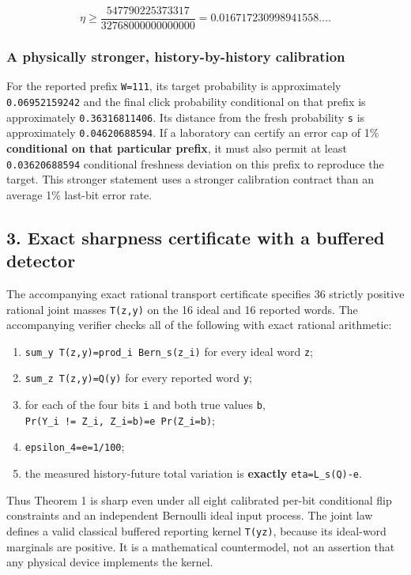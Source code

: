 \documentclass[
  10pt,
  a4paper,
]{article}
\providecommand{\tightlist}{%
  \setlength{\itemsep}{0pt}\setlength{\parskip}{0pt}}
\begin{document}
\[
 \boxed{\eta\ge\frac{547790225373317}{32768000000000000}
         =0.016717230998941558\ldots .}
\]

\subsubsection{A physically stronger, history-by-history calibration}\label{a-physically-stronger-history-by-history-calibration}

For the reported prefix \texttt{W=111}, its target probability is approximately \texttt{0.06952159242} and the final click probability conditional on that prefix is approximately \texttt{0.36316811406}. Its distance from the fresh probability \texttt{s} is approximately \texttt{0.04620688594}. If a laboratory can certify an error cap of 1\% \textbf{conditional on that particular prefix}, it must also permit at least \texttt{0.03620688594} conditional freshness deviation on this prefix to reproduce the target. This stronger statement uses a stronger calibration contract than an average 1\% last-bit error rate.

\subsection{3. Exact sharpness certificate with a buffered detector}\label{exact-sharpness-certificate-with-a-buffered-detector}

The accompanying exact rational transport certificate specifies 36 strictly positive rational joint masses \texttt{T(z,y)} on the 16 ideal and 16 reported words. The accompanying verifier checks all of the following with exact rational arithmetic:

\begin{enumerate}
\def\labelenumi{\arabic{enumi}.}
\tightlist
\item
  \texttt{sum\_y\ T(z,y)=prod\_i\ Bern\_s(z\_i)} for every ideal word \texttt{z};
\item
  \texttt{sum\_z\ T(z,y)=Q(y)} for every reported word \texttt{y};
\item
  for each of the four bits \texttt{i} and both true values \texttt{b}, \texttt{Pr(Y\_i\ !=\ Z\_i,\ Z\_i=b)=e\ Pr(Z\_i=b)};
\item
  \texttt{epsilon\_4=e=1/100};
\item
  the measured history-future total variation is \textbf{exactly} \texttt{eta=L\_s(Q)-e}.
\end{enumerate}

Thus Theorem 1 is sharp even under all eight calibrated per-bit conditional flip constraints and an independent Bernoulli ideal input process. The joint law defines a valid classical buffered reporting kernel \texttt{T(y\textbar{}z)}, because its ideal-word marginals are positive. It is a mathematical countermodel, not an assertion that any physical device implements the kernel.
\end{document}
